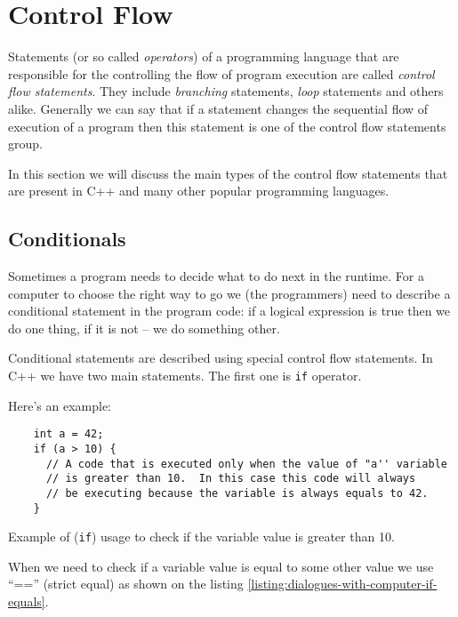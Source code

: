 \documentclass[../sparc.tex]{subfiles}
\begin{document}
\section{Control Flow}

Statements (or so called \emph{operators}) of a programming language that are
responsible for the controlling the flow of program execution are called
\emph{control flow statements}.  They include \emph{branching} statements,
\emph{loop} statements and others alike.  Generally we can say that if a
statement changes the sequential flow of execution of a program then this
statement is one of the control flow statements group.

In this section we will discuss the main types of the control flow statements
that are present in C++ and many other popular programming languages.

\subsection{Conditionals}

Sometimes a program needs to decide what to do next in the runtime.  For a
computer to choose the right way to go we (the programmers) need to describe a
conditional statement in the program code: if a logical expression is true then
we do one thing, if it is not -- we do something other.

Conditional statements are described using special control flow statements.  In
C++ we have two main statements.  The first one is \texttt{if} operator.

Here's an example:

\begin{listing}[ht]
  \begin{verbatim}
    int a = 42;
    if (a > 10) {
      // A code that is executed only when the value of "a'' variable
      // is greater than 10.  In this case this code will always
      // be executing because the variable is always equals to 42.
    }
  \end{verbatim}
  \label{listing:dialogues-with-computer-if-more-than}
  \caption{Example of (\texttt{if}) usage to check if the variable value is
    greater than 10.}
\end{listing}

When we need to check if a variable value is equal to some other value we use
``=='' (strict equal) as shown on the listing
\ref{listing:dialogues-with-computer-if-equals}.
\end{document}
